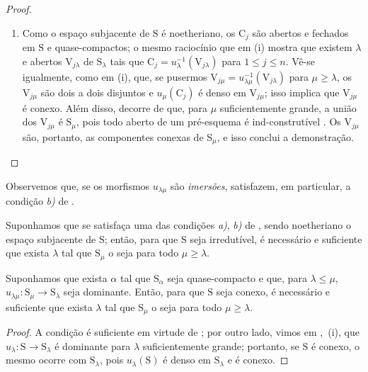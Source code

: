 \begin{proof}
\begin{enumerate}[label=(\roman*)]
  \item Como o espaço subjacente de $\mathrm{S}$ é noetheriano, os $\mathrm{C}_j$ são abertos e fechados em $\mathrm{S}$ e quase-compactos; o mesmo raciocínio que em (i) mostra que existem $\lambda$ e abertos $\mathrm{V}_{j\lambda}$ de $\mathrm{S}_\lambda$ tais que $\mathrm{C}_j=u_\lambda^{-1}(\mathrm{V}_{j\lambda})$ para $1\leqslant j\leqslant n$.
Vê-se igualmente, como em (i), que, se pusermos $\mathrm{V}_{j\mu}=u_{\lambda\mu}^{-1}(\mathrm{V}_{j\lambda})$ para $\mu\geqslant\lambda$, os $\mathrm{V}_{j\mu}$ são dois a dois disjuntos e $u_\mu(\mathrm{C}_j)$ é denso em $\mathrm{V}_{j\mu}$; isso implica que $\mathrm{V}_{j\mu}$ é conexo.
Além disso, decorre de  que, para $\mu$ suficientemente grande, a união dos $\mathrm{V}_{j\mu}$ é $\mathrm{S}_\mu$, pois todo aberto de um pré-esquema é ind-construtível .
Os $\mathrm{V}_{j\mu}$ são, portanto, as componentes conexas de $\mathrm{S}_\mu$, e isso conclui a demonstração.
\end{enumerate}
\end{proof}

Observemos que, se os morfismos $u_{\lambda\mu}$ são \emph{imersões}, satisfazem, em particular, a condição \emph{b)} de .

\begin{corollary}[8.4.3]
\label{IV.8.4.3}
Suponhamos que se satisfaça uma das condições \emph{a)}, \emph{b)} de , sendo noetheriano o espaço subjacente de $\mathrm{S}$; então, para que $\mathrm{S}$ seja irredutível, é necessário e suficiente que exista $\lambda$ tal que $\mathrm{S}_\mu$ o seja para todo $\mu\geqslant\lambda$.
\end{corollary}

\begin{proposition}[8.4.4]
\label{IV.8.4.4}
Suponhamos que exista $\alpha$ tal que $\mathrm{S}_\alpha$ seja quase-compacto e que, para $\lambda\leqslant\mu$, $u_{\lambda\mu}:\mathrm{S}_\mu\to\mathrm{S}_\lambda$ seja dominante.
Então, para que $\mathrm{S}$ seja conexo, é necessário e suficiente que exista $\lambda$ tal que $\mathrm{S}_\mu$ o seja para todo $\mu\geqslant\lambda$.
\end{proposition}

\begin{proof}
A condição é suficiente em virtude de ; por outro lado, vimos em ,~(i), que $u_\lambda:\mathrm{S}\to\mathrm{S}_\lambda$ é dominante para $\lambda$ suficientemente grande; portanto, se $\mathrm{S}$ é conexo, o mesmo ocorre com $\mathrm{S}_\lambda$, pois $u_\lambda(\mathrm{S})$ é denso em $\mathrm{S}_\lambda$ e é conexo.
\end{proof}

